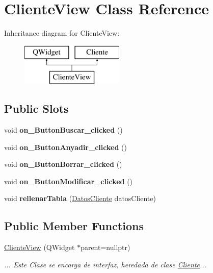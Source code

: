 \hypertarget{classClienteView}{}\section{Cliente\+View Class Reference}
\label{classClienteView}
Inheritance diagram for Cliente\+View\+:\begin{figure}[H]
\begin{center}
\leavevmode
\includegraphics[height=2.000000cm]{classClienteView}
\end{center}
\end{figure}
\subsection*{Public Slots}
\begin{DoxyCompactItemize}
\item 
\mbox{\label{classClienteView_a019ace8139d2b8b8a6d216f0d73729b2}} 
void {\bfseries on\+\_\+\+Button\+Buscar\+\_\+clicked} ()
\item 
\mbox{\label{classClienteView_a0fd9487638e7a19206b7e8104c6fa313}} 
void {\bfseries on\+\_\+\+Button\+Anyadir\+\_\+clicked} ()
\item 
\mbox{\label{classClienteView_ab97e9def1d5d5b61da2802be534c1eff}} 
void {\bfseries on\+\_\+\+Button\+Borrar\+\_\+clicked} ()
\item 
\mbox{\label{classClienteView_ab812b664d6b71ef9d062e2ee62d27bee}} 
void {\bfseries on\+\_\+\+Button\+Modificar\+\_\+clicked} ()
\item 
\mbox{\label{classClienteView_a1a429418d9b58d0417290d29e9a4d731}} 
void {\bfseries rellenar\+Tabla} (\mbox{\hyperlink{structDatosCliente}{Datos\+Cliente}} datos\+Cliente)
\end{DoxyCompactItemize}
\subsection*{Public Member Functions}
\begin{DoxyCompactItemize}
\item 
\mbox{\label{classClienteView_ab1362a221096c58d062d904c2c399059}} 
\mbox{\hyperlink{classClienteView_ab1362a221096c58d062d904c2c399059}{Cliente\+View}} (Q\+Widget $\ast$parent=nullptr)
\begin{DoxyCompactList}\small\item\em ... Este Clase se encarga de interfaz, heredada de clase \mbox{\hyperlink{classCliente}{Cliente}}... \end{DoxyCompactList}\end{DoxyCompactItemize}
